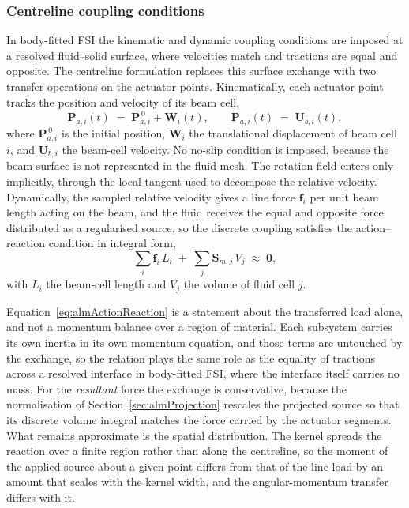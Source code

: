 \subsubsection{Centreline coupling conditions}
In body-fitted FSI the kinematic and dynamic coupling conditions are imposed at a resolved fluid--solid surface, where velocities match and tractions are equal and opposite. The centreline formulation replaces this surface exchange with two transfer operations on the actuator points. Kinematically, each actuator point tracks the position and velocity of its beam cell,
\begin{equation}
\mathbf{P}_{a,i}(t) \;=\; \mathbf{P}_{a,i}^{\,0} + \mathbf{W}_{i}(t),
\qquad
\dot{\mathbf{P}}_{a,i}(t) \;=\; \mathbf{U}_{b,i}(t),
\label{eq:almKinematicCoupling}
\end{equation}
where $\mathbf{P}_{a,i}^{\,0}$ is the initial position, $\mathbf{W}_{i}$ the translational displacement of beam cell $i$, and $\mathbf{U}_{b,i}$ the beam-cell velocity. No no-slip condition is imposed, because the beam surface is not represented in the fluid mesh. The rotation field enters only implicitly, through the local tangent used to decompose the relative velocity. Dynamically, the sampled relative velocity gives a line force $\mathbf{f}_{i}$ per unit beam length acting on the beam, and the fluid receives the equal and opposite force distributed as a regularised source, so the discrete coupling satisfies the action--reaction condition in integral form,
\begin{equation}
\sum_{i} \mathbf{f}_{i}\,L_{i} \;+\; \sum_{j} \mathbf{S}_{m,j}\,V_{j} \;\approx\; \mathbf{0},
\label{eq:almActionReaction}
\end{equation}
with $L_{i}$ the beam-cell length and $V_{j}$ the volume of fluid cell $j$.

\noindent
Equation~\eqref{eq:almActionReaction} is a statement about the transferred load alone, and not a momentum balance over a region of material. Each subsystem carries its own inertia in its own momentum equation, and those terms are untouched by the exchange, so the relation plays the same role as the equality of tractions across a resolved interface in body-fitted FSI, where the interface itself carries no mass. For the \emph{resultant} force the exchange is conservative, because the normalisation of Section~\ref{sec:almProjection} rescales the projected source so that its discrete volume integral matches the force carried by the actuator segments. What remains approximate is the spatial distribution. The kernel spreads the reaction over a finite region rather than along the centreline, so the moment of the applied source about a given point differs from that of the line load by an amount that scales with the kernel width, and the angular-momentum transfer differs with it.

